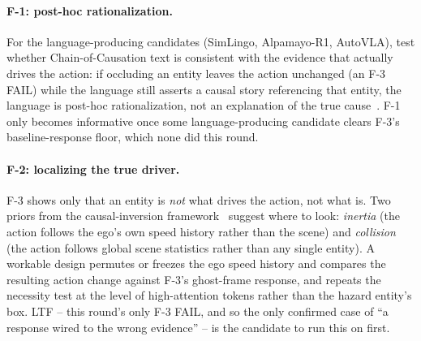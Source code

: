 \paragraph{F-1: post-hoc rationalization.} For the language-producing candidates
(SimLingo, Alpamayo-R1, AutoVLA), test whether Chain-of-Causation text is consistent with
the evidence that actually drives the action: if occluding an entity leaves the action
unchanged (an F-3 FAIL) while the language still asserts a causal story referencing that
entity, the language is post-hoc rationalization, not an explanation of the true
cause~\cite{embodiedinterp2026}. F-1 only becomes informative once some
language-producing candidate clears F-3's baseline-response floor, which none did this
round.

\paragraph{F-2: localizing the true driver.} F-3 shows only that an entity is \emph{not}
what drives the action, not what is. Two priors from the causal-inversion
framework~\cite{samsami2021causal} suggest where to look: \emph{inertia} (the action
follows the ego's own speed history rather than the scene) and \emph{collision} (the
action follows global scene statistics rather than any single entity). A workable design
permutes or freezes the ego speed history and compares the resulting action change
against F-3's ghost-frame response, and repeats the necessity test at the level of
high-attention tokens rather than the hazard entity's box. LTF -- this round's only F-3
FAIL, and so the only confirmed case of ``a response wired to the wrong evidence'' -- is
the candidate to run this on first.
